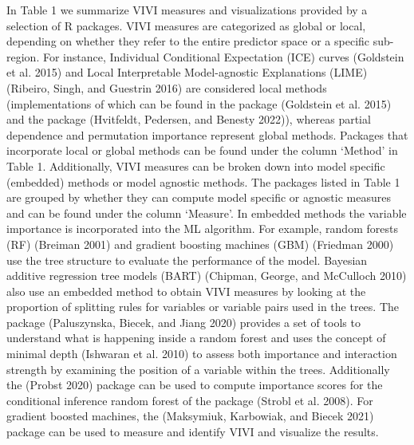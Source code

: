In Table 1 we summarize VIVI measures and visualizations
provided by a selection of R packages. VIVI measures are categorized as global or local, depending on whether they refer to the entire predictor space or a specific sub-region. For instance, Individual Conditional Expectation (ICE) curves (Goldstein et al. 2015) and Local Interpretable Model-agnostic Explanations (LIME) (Ribeiro, Singh, and Guestrin 2016) are considered local methods (implementations of which can be found in the  package (Goldstein et al. 2015) and the  package (Hvitfeldt, Pedersen, and Benesty 2022)), whereas partial dependence and permutation importance represent global methods. Packages that incorporate local or global methods can be found under the column `Method' in Table 1. Additionally, VIVI measures can be broken down into model specific (embedded) methods or model agnostic methods. The packages listed in Table 1 are grouped by whether they can compute model specific or agnostic measures and can be found under the column `Measure'. In embedded methods the variable importance is incorporated into the ML algorithm. For example, random forests (RF)
(Breiman 2001) and gradient boosting machines (GBM) (Friedman 2000) use the tree structure to evaluate the performance of the model. Bayesian additive regression tree models (BART) (Chipman, George, and McCulloch 2010) also use an embedded method to obtain VIVI measures by looking at the
proportion of splitting rules for variables or variable pairs used in the trees. The package  (Paluszynska, Biecek, and Jiang 2020) provides a set of tools to understand what is happening inside a random forest and uses the concept of minimal depth (Ishwaran et al. 2010) to assess both importance and interaction strength by examining the position of a variable within the trees. Additionally the  (Probst 2020) package can be used to compute importance scores for the conditional inference random forest of the  package (Strobl et al. 2008). For gradient boosted machines, the  (Maksymiuk, Karbowiak, and Biecek 2021) package can be used to measure and identify VIVI and visualize the results.

